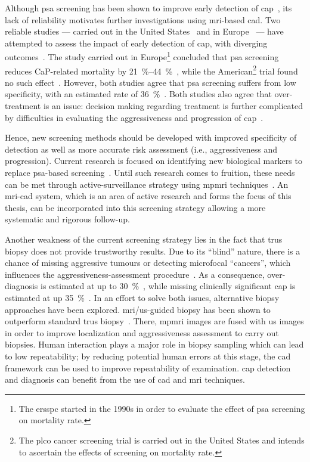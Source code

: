 Although \ac{psa} screening has been shown to improve early detection of
\ac{cap}~\cite{Chou2011}, its lack of reliability motivates further
investigations using \ac{mri}-based \ac{cad}.
Two reliable studies --- carried out in the United States~\cite{Andriole2009}
and in Europe~\cite{Schroeder2012, Hugosson2010} --- have attempted to assess
the impact of early detection of \ac{cap}, with diverging
outcomes~\cite{Chou2011,Heidenreich2013}.
The study carried out in Europe\footnote{The \ac{ersspc} started in the 1990s
  in order to evaluate the effect of \ac{psa} screening on mortality rate.}
concluded that \ac{psa} screening reduces CaP-related mortality by
\SIrange{21}{44}{\percent}~\cite{Schroeder2012, Hugosson2010}, while the
American\footnote{The \ac{plco} cancer screening trial is carried out in the
  United States and intends to ascertain the effects of screening on mortality
  rate.} trial found no such effect~\cite{Andriole2009}.
However, both studies agree that \ac{psa} screening suffers from low
specificity, with an estimated rate of \SI{36}{\percent}~\cite{Schroder2008}.
Both studies also agree that over-treatment is an issue: decision making
regarding treatment is further complicated by difficulties in evaluating the
aggressiveness and progression of \ac{cap}~\cite{Delpierre2013}.

Hence, new screening methods should be developed with improved specificity of
detection as well as more accurate risk assessment (i.e., aggressiveness and
progression).
Current research is focused on identifying new biological markers to replace
\ac{psa}-based screening~\cite{Bourdoumis2010,Morgan2011,Brenner2013}.
Until such research comes to fruition, these needs can be met through
active-surveillance strategy using \ac{mpmri}
techniques~\cite{Hoeks2011,Moore2013}.
An \ac{mri}-\acs{cad} system, which is an area of active research and forms the
focus of this thesis, can be incorporated into this screening strategy allowing
a more systematic and rigorous follow-up.

Another weakness of the current screening strategy lies in the fact that
\ac{trus} biopsy does not provide trustworthy results.
Due to its ``blind'' nature, there is a chance of missing aggressive tumours or
detecting microfocal ``cancers'', which influences the
aggressiveness-assessment procedure~\cite{Noguchi2001}.
As a consequence, over-diagnosis is estimated at up to
\SI{30}{\percent}~\cite{Haas2007}, while missing clinically significant
\ac{cap} is estimated at up \SI{35}{\percent}~\cite{Taira2010}.
In an effort to solve both issues, alternative biopsy approaches have been
explored.
\ac{mri}/\ac{us}-guided biopsy has been shown to outperform standard \ac{trus}
biopsy~\cite{Delongchamps2013}.
There, \ac{mpmri} images are fused with \ac{us} images in order to improve
localization and aggressiveness assessment to carry out biopsies.
Human interaction plays a major role in biopsy sampling which can lead to low
repeatability; by reducing potential human errors at this stage, the \acs{cad}
framework can be used to improve repeatability of examination.
\ac{cap} detection and diagnosis can benefit from the use of \acs{cad} and
\ac{mri} techniques.

